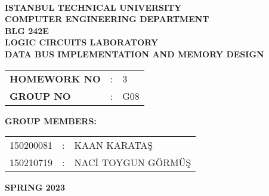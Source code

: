 \documentclass[pdftex,12pt,a4paper]{article}
\begin{document}
\begin{titlepage}
\begin{center}
\textbf{}\\
\textbf{\Large{ISTANBUL TECHNICAL UNIVERSITY}}\\
\vspace{0.5cm}
\textbf{\Large{COMPUTER ENGINEERING DEPARTMENT}}\\
\vspace{2cm}
\textbf{\Large{BLG 242E}}\\
\vspace{0.2cm}
\textbf{\Large{LOGIC CIRCUITS LABORATORY}}\\
\vspace{0.2cm}
\textbf{\Large{DATA BUS IMPLEMENTATION AND MEMORY DESIGN}}\\
\vspace{2cm}
\begin{table}[ht]
\centering
\Large{
\begin{tabular}{lcl}
\textbf{HOMEWORK NO}  & : & 3 \\
\textbf{GROUP NO}  & : & G08 \\
\end{tabular}}\end{table}\vspace{1cm}
\textbf{\Large{GROUP MEMBERS:}}\\
\begin{table}[ht]\centering\Large{
\begin{tabular}{rcl}
150200081  & : & KAAN KARATAŞ \\
150210719  & : & NACİ TOYGUN GÖRMÜŞ \\
\end{tabular}}
\end{table}
\vspace{2.8cm}
\textbf{\Large{SPRING 2023}}
\end{center}
\end{titlepage}
\end{document}
